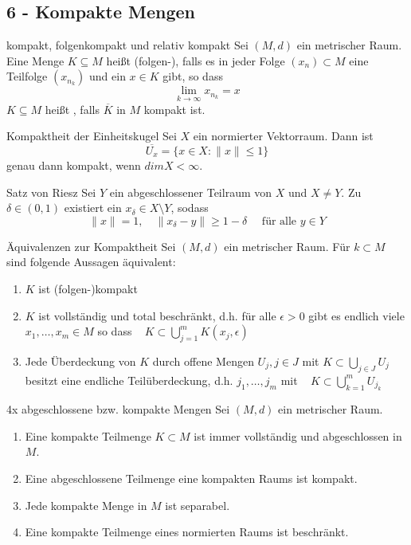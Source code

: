 \subsection*{6 - Kompakte Mengen}

	\begin{karte}{kompakt, folgenkompakt und relativ kompakt}
		Sei $(M, d)$ ein metrischer Raum. Eine Menge $K \subseteq M$ hei{\ss}t (folgen-), falls es in jeder Folge $(x_{n}) \subset M$ eine Teilfolge $(x_{n_{k}})$ und ein $x \in K$ gibt, so dass 
		\[ \lim_{k \rightarrow \infty} x_{n_{k}} = x \]
		$K \subseteq M$ hei{\ss}t , falls $\overline{K}$ in $M$ kompakt ist.	
	\end{karte}
	
	\begin{karte}{Kompaktheit der Einheitskugel}
		Sei $X$ ein normierter Vektorraum. Dann ist
		\[ \overline{U_{x}} = \{ x \in X: \| x \| \leq 1 \} \]
		genau dann kompakt, wenn $dim X < \infty$.
	\end{karte}
	
	\begin{karte}{Satz von Riesz}
		Sei $Y$ ein abgeschlossener Teilraum von $X$ und $X \neq Y$. Zu $\delta \in (0, 1)$ existiert ein $x_{\delta} \in X \setminus Y$, sodass
		\[ \| x \| = 1, \quad \| x_{\delta} - y\| \geq 1 - \delta \quad \text{ für alle } y \in Y \]
	\end{karte}
	
	\begin{karte}{Äquivalenzen zur Kompaktheit}
		Sei $(M, d)$ ein metrischer Raum. Für $k \subset M$ sind folgende Aussagen äquivalent:
		\begin{enumerate}[label=\alph*\upshape)]
		 	\item $K$ ist (folgen-)kompakt
			\item $K$ ist vollständig und total beschränkt, d.h. für alle $\epsilon > 0$ gibt es endlich viele $x_{1}, \dotsc, x_{m} \in M$ so dass ~ $K \subset \bigcup_{j = 1}^{m} K(x_{j}, \epsilon)$
			\item Jede Überdeckung von $K$ durch offene Mengen $U_{j}, j \in J$ mit $K \subset \bigcup_{j \in J} U_{j}$ besitzt eine endliche Teilüberdeckung, d.h. $j_{1}, \dotsc, j_{m}$ mit ~ $K \subset \bigcup_{k = 1}^{m} U_{j_{k}}$
		\end{enumerate}	
	\end{karte}
	
	\begin{karte}{4x abgeschlossene bzw. kompakte Mengen}
		Sei $(M, d)$ ein metrischer Raum.
	\begin{enumerate}[label=\alph*\upshape)]
		\item Eine kompakte Teilmenge $K \subset M$ ist immer vollständig und abgeschlossen in $M$.
		\item Eine abgeschlossene Teilmenge eine kompakten Raums ist kompakt.
		\item Jede kompakte Menge in $M$ ist separabel.
		\item Eine kompakte Teilmenge eines normierten Raums ist beschränkt.
	\end{enumerate}
	\end{karte}
		
